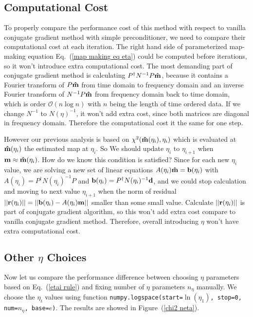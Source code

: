 \documentclass[twocolumn,linenumbers]{aastex631}
\newcommand{\vbd}{\vb{d}}
\newcommand{\vbm}{\vb{m}}
\newcommand{\vbb}{\vb{b}}
\newcommand{\inv}[1]{#1^{-1}}
\newcommand{\hatm}{\vb{\hat{m}}}
\newcommand{\Pdagger}{P^{\dagger}}
\begin{document}
\subsection{Computational Cost}
To properly compare the performance cost of this method with respect to vanilla
conjugate gradient method with simple preconditioner,
we need to compare their computational cost at each iteration.
The right hand side of parameterized map-making equation
Eq.~(\ref{map making eq eta})
could be computed before iterations,
so it won't introduce extra computational cost.
The most demanding part of conjugate gradient method is calculating
$\Pdagger \inv{N} P \hatm$, because it contains a Fourier transform of
$P\hatm$ from time domain to frequency domain and an inverse Fourier transform
of $\inv{N} P \hatm$ from frequency domain back to time domain,
which is order $\mathcal{O}(n\log n)$ with $n$ being the length of time ordered
data.
If we change $\inv{N}$ to $\inv{N(\eta)}$, it won't add extra cost,
since both matrices are diagonal in frequency domain.
Therefore the computational cost it the same for one step.

However our previous analysis is based on
$\chi^2(\hatm(\eta_i), \eta_i)$ which is evaluated at 
$\hatm(\eta_i)$ the estimated map at $\eta_i$.
So We should update $\eta_i$ to $\eta_{i+1}$ when $\vbm \approx \hatm(\eta_i)$. 
How do we know this condition is satisfied?
Since for each new $\eta_i$ value, we are solving a new set of linear
equations $A(\eta_i) \hatm = \vbb(\eta_i)$ with
$A(\eta_i) = \Pdagger \inv{N(\eta_i)} P$ and 
$\vbb(\eta_i) = \Pdagger \inv{N(\eta_i)} \vbd$,
and we could stop calculation and moving to next value $\eta_{i+1}$ when the 
norm of residual 
$\qty||\vb{r}(\eta_i)|| = \qty||\vbb(\eta_i) - A(\eta_i) \vbm||$
smaller than some small value.
Calculate $\qty||\vb{r}(\eta_i)||$ is part of conjugate gradient algorithm,
so this won't add extra cost compare to vanilla conjugate gradient method.
Therefore, overall introducing $\eta$ won't have extra computational cost.


\subsection{Other $\eta$ Choices}
Now let us compare the performance difference between choosing $\eta$
parameters based on Eq.~(\ref{etai rule})
and fixing number of $\eta$ parameters $n_{\eta}$ manually.
We choose the $\eta_i$ values using function
\texttt{numpy.logspace(start=$\ln(\eta_1)$, stop=0, num=$n_{\eta}$, base=$e$)}.
The results are showed in Figure~(\ref{chi2 neta}).
\end{document}
